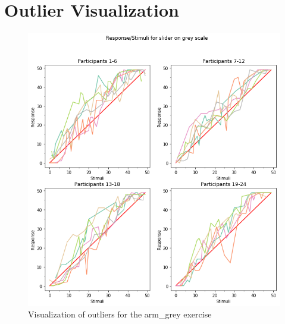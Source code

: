 \chapter{Outlier Visualization}\label{plots_appendix}
\begin{figure}[h!]
\centering
\includegraphics[width=1.1\textwidth]{figures/visual_out1.png}
\caption{Visualization of outliers for the arm\_grey exercise}
\label{NAN}
\end{figure}

